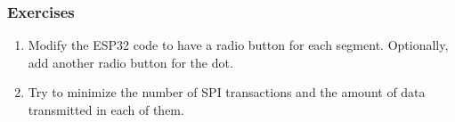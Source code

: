 \subsubsection{Exercises}
\begin{enumerate}
    \item Modify the ESP32 code to have a radio button for each segment.
    Optionally, add another radio button for the dot.
    \item Try to minimize the number of SPI transactions and the amount of data
    transmitted in each of them.
\end{enumerate}